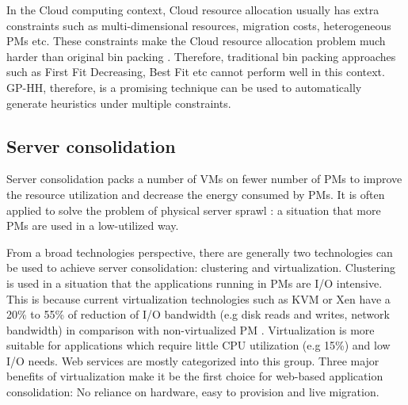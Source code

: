 In the Cloud computing context,  Cloud resource allocation usually has extra constraints such as multi-dimensional resources, migration costs, heterogeneous PMs etc. These constraints make the Cloud resource allocation problem much harder than original bin packing \cite{Mann:2015ua}. Therefore, traditional bin packing approaches such as First Fit Decreasing, Best Fit etc cannot perform well in this context.  GP-HH, therefore, is a promising technique can be used to automatically generate heuristics under multiple constraints.

\subsection{Server consolidation}

Server consolidation packs a number of VMs on fewer number of PMs to improve the resource utilization and decrease the energy consumed by PMs. It is often applied to solve the problem of physical server sprawl \cite{Khanna:2006vq}: a situation that more PMs are used in a low-utilized way. 



From a broad technologies perspective, there are generally two technologies can be used to achieve server consolidation: clustering and virtualization. Clustering is used in a situation that the applications running in PMs are I/O intensive. This is because current virtualization technologies  such as KVM \cite{Kivity:2007wu} or Xen \cite{Barham:2003cj} have a 20\% to 55\% of reduction of I/O bandwidth (e.g disk reads and writes, network bandwidth) in comparison with non-virtualized PM \cite{Shafer:2010vh}. Virtualization is more suitable for applications which require little CPU utilization (e.g 15\%) and low I/O needs. Web services are mostly categorized into this group. Three major benefits of virtualization make it be the first choice for web-based application consolidation: No reliance on hardware, easy to provision and live migration.

